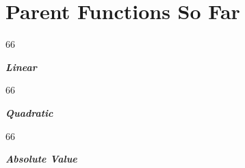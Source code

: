 \section{Parent Functions So Far}

\begin{tcbraster}[raster columns=3,]
    \begin{tcolorbox}[]
        \centering
        \begin{myTikzpictureGrid}{0.3} {6}{6}
        \end{myTikzpictureGrid}
        {\bfseries\itshape Linear\\[0.5em]}
        {
        }
    \end{tcolorbox}
    \begin{tcolorbox}[]
        \centering
        \begin{myTikzpictureGrid}{0.3} {6}{6}
        \end{myTikzpictureGrid}
        {\bfseries\itshape Quadratic\\[0.5em]}
        {
        }
    \end{tcolorbox}
    \begin{tcolorbox}[]
        \centering
        \begin{myTikzpictureGrid}{0.3} {6}{6}
        \end{myTikzpictureGrid}
        {\bfseries\itshape Absolute Value\\[0.5em]}
        {
        }
    \end{tcolorbox}
\end{tcbraster}






